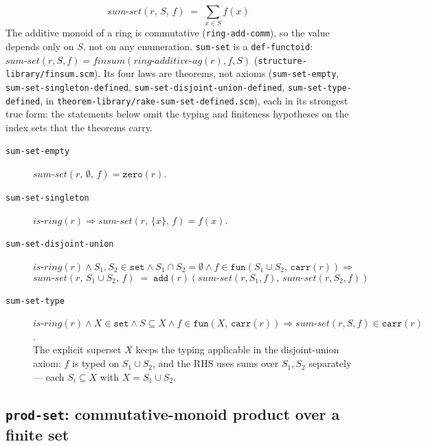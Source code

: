 \[
   \mathit{sum\text{-}set}(r,\, S,\, f) \;=\; \sum_{x \in S} f(x)
\]
The additive monoid of a ring is commutative
(\texttt{ring-add-comm}), so the value depends only on $S$, not on any
enumeration.  \texttt{sum-set} is a \texttt{def-functoid}:
$\mathit{sum\text{-}set}(r, S, f) = \mathit{finsum}(\mathit{ring\text{-}additive\text{-}ag}(r), f, S)$
(\texttt{structure-library/finsum.scm}).  Its four laws are theorems, not axioms
(\texttt{sum-set-empty}, \texttt{sum-set-singleton-defined},
\texttt{sum-set-disjoint-union-defined}, \texttt{sum-set-type-defined}, in
\texttt{theorem-library/rake-sum-set-defined.scm}), each in its strongest true
form: the statements below omit the typing and finiteness hypotheses on the
index sets that the theorems carry.
\begin{description}
\item[\texttt{sum-set-empty}]
  $\mathit{sum\text{-}set}(r,\, \emptyset,\, f) = \mathtt{zero}(r)$.
\item[\texttt{sum-set-singleton}]
  $\mathit{is\text{-}ring}(r) \Rightarrow
   \mathit{sum\text{-}set}(r,\, \{x\},\, f) = f(x)$.
\item[\texttt{sum-set-disjoint-union}]
  $\mathit{is\text{-}ring}(r) \land S_1, S_2 \in \mathtt{set}
   \land S_1 \cap S_2 = \emptyset \land f \in \mathtt{fun}(S_1 \cup S_2,\, \mathtt{carr}(r))
   \Rightarrow$
  \[
    \mathit{sum\text{-}set}(r,\, S_1 \cup S_2,\, f)
    \;=\; \mathtt{add}(r)(\mathit{sum\text{-}set}(r, S_1, f),\,
                          \mathit{sum\text{-}set}(r, S_2, f))
  \]
\item[\texttt{sum-set-type}]
  $\mathit{is\text{-}ring}(r) \land X \in \mathtt{set}
   \land S \subseteq X \land f \in \mathtt{fun}(X,\, \mathtt{carr}(r))
   \Rightarrow \mathit{sum\text{-}set}(r, S, f) \in \mathtt{carr}(r)$.
  \\
  The explicit superset $X$ keeps the typing applicable in the
  disjoint-union axiom: $f$ is typed on $S_1 \cup S_2$, and the RHS
  uses sums over $S_1, S_2$ separately --- each $S_i \subseteq X$
  with $X = S_1 \cup S_2$.
\end{description}

\subsection{\texttt{prod-set}: commutative-monoid product over a finite set}

